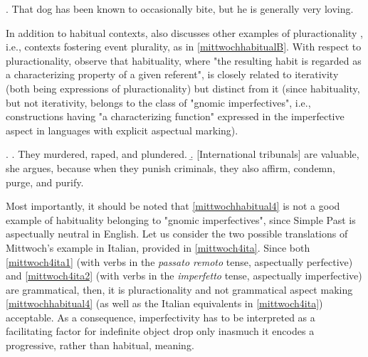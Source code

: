 \ex. \label{goldz} That dog has been known to occasionally bite, but he is generally very loving.  

In addition to habitual contexts, \textcite[248]{Mittwoch2005} also discusses other examples of pluractionality \parencite{lasersohn1995plurality2013}, i.e., contexts fostering event plurality, as in \ref{mittwochhabitualB}. With respect to pluractionality, \textcite{BertinettoLenci2012habituality} observe that habituality, where "the resulting habit is regarded as a characterizing property of a given referent", is closely related to iterativity (both being expressions of pluractionality) but distinct from it (since habituality, but not iterativity, belongs to the class of "gnomic imperfectives", i.e., constructions having "a characterizing function" expressed in the imperfective aspect in languages with explicit aspectual marking).

\ex. \label{mittwochhabitualB} \a. \label{mittwochhabitual4} They murdered, raped, and plundered.
\b. \label{mittwochhabitual5} [International tribunals] are valuable, she argues, because when they punish criminals, they also affirm, condemn, purge, and purify.

Most importantly, it should be noted that \ref{mittwochhabitual4} is not a good example of habituality belonging to "gnomic imperfectives", since Simple Past is aspectually neutral in English. Let us consider the two possible translations of Mittwoch's example in Italian, provided in \ref{mittwoch4ita}. Since both \ref{mittwoch4ita1} (with verbs in the \textit{passato remoto} tense, aspectually perfective) and \ref{mittwoch4ita2} (with verbs in the \textit{imperfetto} tense, aspectually imperfective) are grammatical, then, it is pluractionality and not grammatical aspect making \ref{mittwochhabitual4} (as well as the Italian equivalents in \ref{mittwoch4ita}) acceptable. As a consequence, imperfectivity has to be interpreted as a facilitating factor for indefinite object drop only inasmuch it encodes a progressive, rather than habitual, meaning.

